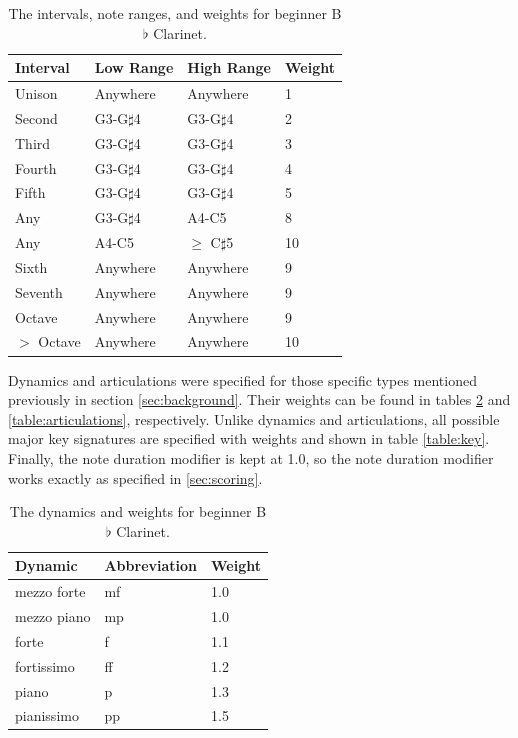 \documentclass[10pt,preprint]{sigplanconf}
\begin{document}
{\begin{table}[t]
	\centering
    \begin{tabular}{| l | l | l | l |}
        \hline
        Interval & Low Range & High Range & Weight \\ \hline
        Unison & Anywhere & Anywhere & 1 \\ \hline
        Second & G3-G$\sharp$4 & G3-G$\sharp$4 & 2 \\ \hline
        Third & G3-G$\sharp$4 & G3-G$\sharp$4 & 3 \\ \hline
        Fourth & G3-G$\sharp$4 & G3-G$\sharp$4 & 4 \\ \hline
        Fifth & G3-G$\sharp$4 & G3-G$\sharp$4 & 5 \\ \hline
        Any & G3-G$\sharp$4 & A4-C5 & 8 \\ \hline
        Any & A4-C5 & $\geq$ C$\sharp$5 & 10 \\ \hline
        Sixth & Anywhere & Anywhere & 9 \\ \hline
        Seventh & Anywhere & Anywhere & 9 \\ \hline
        Octave & Anywhere & Anywhere & 9 \\ \hline
        $>$ Octave & Anywhere & Anywhere & 10 \\
        \hline
    \end{tabular}
	\caption{The intervals, note ranges, and weights for beginner B$\flat$ Clarinet.}
	\label{table:intervals}
\end{table}

Dynamics and articulations were specified for those specific types mentioned previously in section \ref{sec:background}. Their weights can be found in tables \ref{table:dynamics} and \ref{table:articulations}, respectively. Unlike dynamics and articulations, all possible major key signatures are specified with weights and shown in table \ref{table:key}. Finally, the note duration modifier is kept at 1.0, so the note duration modifier works exactly as specified in \ref{sec:scoring}.

\begin{table}[]
	\centering
    \begin{tabular}{| l | l | l |}
        \hline
        Dynamic & Abbreviation & Weight \\ \hline
        mezzo forte & mf & 1.0 \\ \hline
        mezzo piano & mp & 1.0 \\ \hline
        forte & f & 1.1 \\ \hline
        fortissimo & ff & 1.2 \\ \hline
        piano & p & 1.3 \\ \hline
        pianissimo & pp & 1.5 \\
        \hline
    \end{tabular}
	\caption{The dynamics and weights for beginner B$\flat$ Clarinet.}
	\label{table:dynamics}
\end{table}

}
\end{document}
